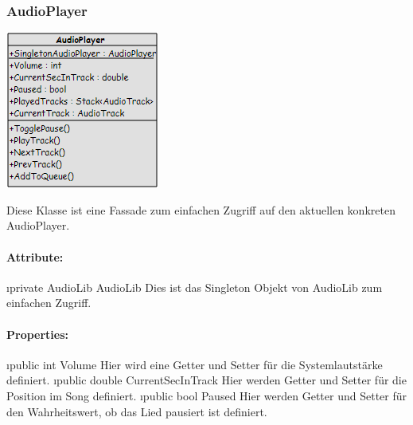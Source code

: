 \documentclass[../entwurf.tex]{subfiles}
\begin{document}
			\subsubsection{AudioPlayer}
				\begin{minipage}{0.45\textwidth}
					\includegraphics[width=\textwidth,height=\textheight,keepaspectratio]{../graphics/m_klassen/AudioPlayer.png}
				\end{minipage}
				\begin{minipage}{0.55\textwidth}
					Diese Klasse ist eine Fassade zum einfachen Zugriff auf den aktuellen konkreten AudioPlayer.
				\end{minipage}
				\paragraph{Attribute:}
					\begin{itemize}
						\i{private AudioLib AudioLib} Dies ist das Singleton Objekt von AudioLib zum einfachen Zugriff.
					\end{itemize}
				\paragraph{Properties:}
					\begin{itemize}
						\i{public int Volume} Hier wird eine Getter und Setter für die Systemlautstärke definiert.
						\i{public double CurrentSecInTrack} Hier werden Getter und Setter für die Position im Song definiert.
						\i{public bool Paused} Hier werden Getter und Setter für den Wahrheitswert, ob das Lied pausiert ist definiert.
					\end{itemize}
\end{document}
